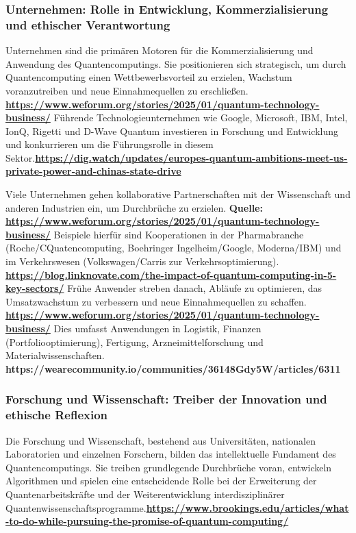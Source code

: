\subsubsection{Unternehmen: Rolle in Entwicklung, Kommerzialisierung und ethischer Verantwortung}
Unternehmen sind die primären Motoren für die Kommerzialisierung und Anwendung des Quantencomputings. Sie positionieren sich strategisch, um durch Quantencomputing einen Wettbewerbsvorteil zu erzielen, Wachstum voranzutreiben und neue Einnahmequellen zu erschließen.\textbf{ \href{https://www.weforum.org/stories/2025/01/quantum-technology-business/}{https://www.weforum.org/stories/2025/01/quantum-technology-business/} }Führende Technologieunternehmen wie Google, Microsoft, IBM, Intel, IonQ, Rigetti und D-Wave Quantum investieren in Forschung und Entwicklung und konkurrieren um die Führungsrolle in diesem Sektor.\textbf{\href{https://dig.watch/updates/europes-quantum-ambitions-meet-us-private-power-and-chinas-state-drive}{https://dig.watch/updates/europes-quantum-ambitions-meet-us-private-power-and-chinas-state-drive}}

Viele Unternehmen gehen kollaborative Partnerschaften mit der Wissenschaft und anderen Industrien ein, um Durchbrüche zu erzielen.\textbf{ Quelle: \href{https://www.weforum.org/stories/2025/01/quantum-technology-business/}{https://www.weforum.org/stories/2025/01/quantum-technology-business/} }Beispiele hierfür sind Kooperationen in der Pharmabranche (Roche/CQuatencomputing, Boehringer Ingelheim/Google, Moderna/IBM) und im Verkehrswesen (Volkswagen/Carris zur Verkehrsoptimierung). \textbf{\href{https://blog.linknovate.com/the-impact-of-quantum-computing-in-5-key-sectors/}{https://blog.linknovate.com/the-impact-of-quantum-computing-in-5-key-sectors/}} Frühe Anwender streben danach, Abläufe zu optimieren, das Umsatzwachstum zu verbessern und neue Einnahmequellen zu schaffen. \textbf{\href{https://www.weforum.org/stories/2025/01/quantum-technology-business/}{https://www.weforum.org/stories/2025/01/quantum-technology-business/}} Dies umfasst Anwendungen in Logistik, Finanzen (Portfoliooptimierung), Fertigung, Arzneimittelforschung und Materialwissenschaften. \textbf{https://wearecommunity.io/communities/36148Gdy5W/articles/6311}


\subsubsection{Forschung und Wissenschaft: Treiber der Innovation und ethische Reflexion}
Die Forschung und Wissenschaft, bestehend aus Universitäten, nationalen Laboratorien und einzelnen Forschern, bilden das intellektuelle Fundament des Quantencomputings. Sie treiben grundlegende Durchbrüche voran, entwickeln Algorithmen und spielen eine entscheidende Rolle bei der Erweiterung der Quantenarbeitskräfte und der Weiterentwicklung interdisziplinärer Quantenwissenschaftsprogramme.\textbf{\href{https://www.brookings.edu/articles/what-to-do-while-pursuing-the-promise-of-quantum-computing/}{https://www.brookings.edu/articles/what-to-do-while-pursuing-the-promise-of-quantum-computing/}}

